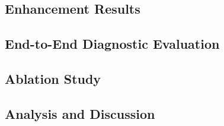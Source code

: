 % 

\subsection{Enhancement Results}
\label{sec:exp:enhance}



% 

\subsection{End-to-End Diagnostic Evaluation}
\label{sec:exp:downstream}



\subsection{Ablation Study}
\label{sec:exp:ablation}



% 

\subsection{Analysis and Discussion}
\label{sec:exp:discussion}


